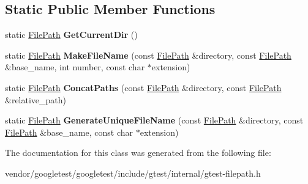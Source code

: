 \subsection*{Static Public Member Functions}
\begin{DoxyCompactItemize}
\item 
static \hyperlink{classtesting_1_1internal_1_1FilePath}{File\+Path} {\bfseries Get\+Current\+Dir} ()\hypertarget{classtesting_1_1internal_1_1FilePath_a0f7b48e493656679cb82a2b679620c4e}{}\label{classtesting_1_1internal_1_1FilePath_a0f7b48e493656679cb82a2b679620c4e}

\item 
static \hyperlink{classtesting_1_1internal_1_1FilePath}{File\+Path} {\bfseries Make\+File\+Name} (const \hyperlink{classtesting_1_1internal_1_1FilePath}{File\+Path} \&directory, const \hyperlink{classtesting_1_1internal_1_1FilePath}{File\+Path} \&base\+\_\+name, int number, const char $\ast$extension)\hypertarget{classtesting_1_1internal_1_1FilePath_a1e7793eaae21c6629afe8be11064b111}{}\label{classtesting_1_1internal_1_1FilePath_a1e7793eaae21c6629afe8be11064b111}

\item 
static \hyperlink{classtesting_1_1internal_1_1FilePath}{File\+Path} {\bfseries Concat\+Paths} (const \hyperlink{classtesting_1_1internal_1_1FilePath}{File\+Path} \&directory, const \hyperlink{classtesting_1_1internal_1_1FilePath}{File\+Path} \&relative\+\_\+path)\hypertarget{classtesting_1_1internal_1_1FilePath_ad58aa6d8b160d0ba0b661f56f0980e26}{}\label{classtesting_1_1internal_1_1FilePath_ad58aa6d8b160d0ba0b661f56f0980e26}

\item 
static \hyperlink{classtesting_1_1internal_1_1FilePath}{File\+Path} {\bfseries Generate\+Unique\+File\+Name} (const \hyperlink{classtesting_1_1internal_1_1FilePath}{File\+Path} \&directory, const \hyperlink{classtesting_1_1internal_1_1FilePath}{File\+Path} \&base\+\_\+name, const char $\ast$extension)\hypertarget{classtesting_1_1internal_1_1FilePath_ab22637ea53e3918ec814dc6a5fecd1f9}{}\label{classtesting_1_1internal_1_1FilePath_ab22637ea53e3918ec814dc6a5fecd1f9}

\end{DoxyCompactItemize}


The documentation for this class was generated from the following file\+:\begin{DoxyCompactItemize}
\item 
vendor/googletest/googletest/include/gtest/internal/gtest-\/filepath.\+h\end{DoxyCompactItemize}
